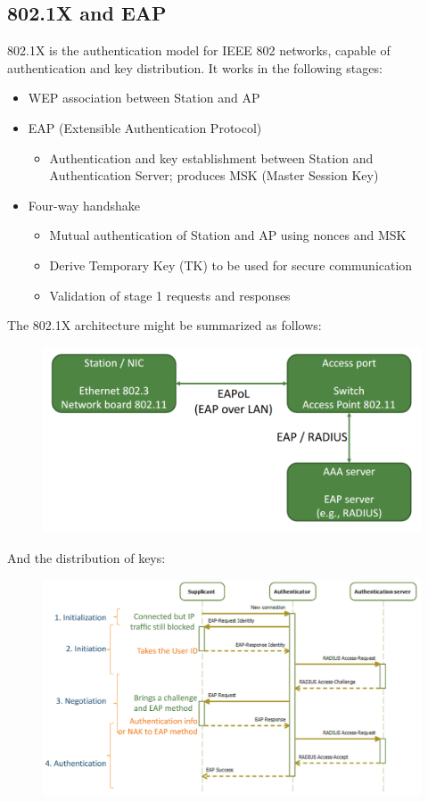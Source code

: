\documentclass[10pt,a4paper]{report}
\begin{document}
\subsection{802.1X and EAP}
802.1X is the authentication model for IEEE 802 networks, capable of authentication and key distribution. It works in the following stages:
\begin{itemize}
\item WEP association between Station and AP
\item EAP (Extensible Authentication Protocol)
\begin{itemize}
\item Authentication and key establishment between Station and Authentication Server; produces MSK (Master Session Key)
\end{itemize}
\item Four-way handshake
\begin{itemize}
\item Mutual authentication of Station and AP using nonces and MSK
\item Derive Temporary Key (TK) to be used for secure communication
\item Validation of stage 1 requests and responses
\end{itemize}
\end{itemize}
The 802.1X architecture might be summarized as follows:
\begin{figure}[H]
\centering
\includegraphics[scale=0.4]{37.png}
\end{figure}
And the distribution of keys:
\begin{figure}[H]
\centering
\includegraphics[scale=0.4]{38.png}
\end{figure}
\end{document}
